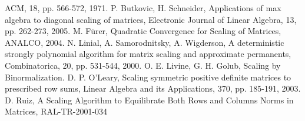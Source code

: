 \documentclass{report}
\begin{document}
ACM, 18, pp. 566-572, 1971.
\newline
[2] P. Butkovic, H. Schneider, Applications of max algebra to diagonal
scaling of matrices, Electronic Journal of Linear Algebra, 13, pp.
262-273, 2005.
\newline
[3] M. F\"{u}rer, Quadratic Convergence for Scaling of Matrices, ANALCO, 2004.
\newline
[4] N. Linial, A. Samorodnitsky, A. Wigderson, A deterministic strongly
polynomial algorithm for matrix scaling and approximate permanents,
Combinatorica, 20, pp. 531-544, 2000.
\newline
[5] O. E. Livine, G. H. Golub, Scaling by Binormalization.
\newline
[6] D. P. O'Leary, Scaling symmetric positive definite matrices to
prescribed row sums, Linear Algebra and its Applications, 370, pp.
185-191, 2003.
\newline
[7] D. Ruiz, A Scaling Algorithm to Equilibrate Both Rows and Columns
Norms in Matrices, RAL-TR-2001-034
\end{document}
